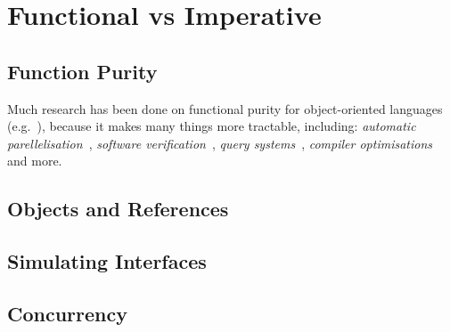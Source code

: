 \newpage
\section{Functional vs Imperative}



\subsection{Function Purity}
Much research has been done on functional purity for object-oriented
languages (e.g.~\cite{Pea11,Rou04,SR05,MRR02}), because it makes 
many things more tractable, including: {\em automatic
 parellelisation}~\cite{ABCR10,CRPAHBW10}, {\em software
 verification}~\cite{Leav02,BNSS04,BA05,DL07}, {\em query
 systems}~\cite{LHS97,WPN08}, {\em compiler
 optimisations}~\cite{Cla97,LLH05,ZRKW08} and more.

\subsection{Objects and References}
\subsection{Simulating Interfaces}
\subsection{Concurrency}